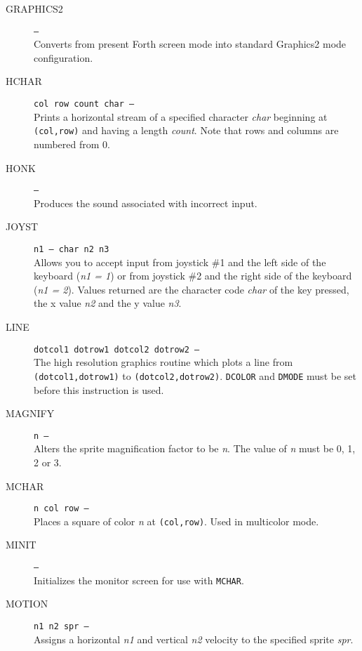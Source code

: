 \documentclass{article}
\begin{document}
\begin{multicols}{2}[]
\begin{description}
			\item[GRAPHICS2]\texttt{--- }\\
				Converts from present Forth screen mode into standard Graphics2 mode
				configuration.

			\item[HCHAR]\texttt{col row count char --- }\\
				Prints a horizontal stream of a specified character \textit{char}
				beginning at \verb|(col,row)| and having a length \textit{count}.
				Note that rows and columns are numbered from 0.

			\item[HONK]\texttt{--- }\\
				Produces the sound associated with incorrect input.

			\item[JOYST]\texttt{n1 --- char n2 n3 }\\
				Allows you to accept input from joystick \#1 and the left side of
				the keyboard (\textit{n1 = 1}) or from joystick \#2 and the right
				side of the keyboard (\textit{n1 = 2}). Values returned are
				the character code \textit{char} of the key pressed, the x value
				\textit{n2} and the y value \textit{n3}.

			\item[LINE]\texttt{dotcol1 dotrow1 dotcol2 dotrow2 --- }\\
				The high resolution graphics routine which plots a line from
				\verb|(dotcol1,dotrow1)| to \verb|(dotcol2,dotrow2)|. \verb|DCOLOR|
				and \verb|DMODE| must be set before this instruction is used.

			\item[MAGNIFY]\texttt{n --- }\\
				Alters the sprite magnification factor to be \textit{n}. The value
				of \textit{n} must be 0, 1, 2 or 3.

			\item[MCHAR]\texttt{n col row --- }\\
				Places a square of color \textit{n} at \verb|(col,row)|. Used in
				multicolor mode.

			\item[MINIT]\texttt{--- }\\
				Initializes the monitor screen for use with \verb|MCHAR|.

			\item[MOTION]\texttt{n1 n2 spr --- }\\
				Assigns a horizontal \textit{n1} and vertical \textit{n2} velocity
				to the specified sprite \textit{spr}.


\end{description}
\end{multicols}
\end{document}
